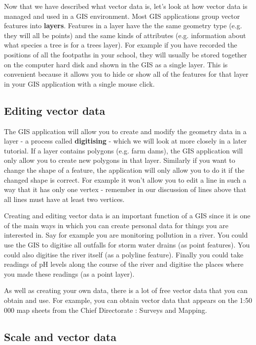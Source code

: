 Now that we have described what vector data is, let's look at how vector data
is managed and used in a GIS environment. Most GIS applications group vector
features into \textbf{layers}. Features in a layer have the the same geometry
type
(e.g. they will all be points) and  the same kinds of attributes (e.g.
information about what species a tree is for a trees layer). For example if
you have recorded the positions of all the footpaths in your school, they
will usually be stored together on the computer hard disk and shown in the
GIS as a single layer. This is convenient because it allows you to hide or
show all of the features for that layer in your GIS application with a single
mouse click.

\subsection{Editing vector data}\label{subsec:editvector}

The GIS application will allow you to create and modify the geometry data in
a layer - a process called \textbf{digitising} - which we will look at more
closely in
a later tutorial. If a layer contains polygons (e.g. farm dams), the GIS
application will only allow you to create new polygons in that layer.
Similarly if you want to change the shape of a feature, the application will
only allow you to do it if the changed shape is correct. For example it won't
allow you to edit a line in such a way that it has only one vertex - remember
in our discussion of lines above that all lines must have at least two
vertices.

Creating and editing vector data is an important function of a GIS since it
is one of the main ways in which you can create personal data for things you
are interested in. Say for example you are monitoring pollution in a river.
You could use the GIS to digitise all outfalls for storm water drains (as
point features). You could also digitise the river itself (as a polyline
feature). Finally you could take readings of pH levels along the course of
the river and digitise the places where you made these readings (as a point
layer).  

As well as creating your own data, there is a lot of free vector data that
you can obtain and use. For example, you can obtain vector data that appears
on the 1:50 000 map sheets from the Chief Directorate : Surveys and Mapping.

\subsection{Scale and vector data}\label{subsec:vectorscale}

